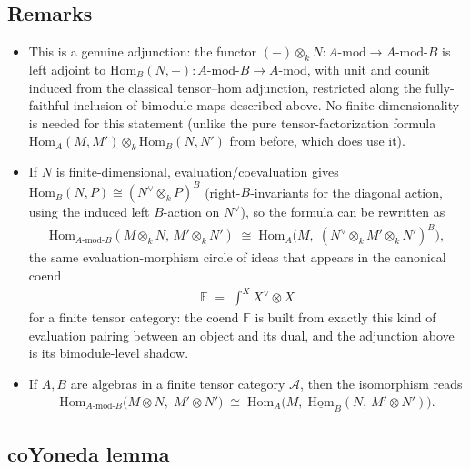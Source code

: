 \documentclass[11pt]{article}
\theoremstyle{definition}
\begin{document}
\subsection*{Remarks}

\begin{itemize}
\item This is a genuine adjunction: the functor $(-)\otimes_k N : A\text{-}\mathrm{mod}
\to A\text{-}\mathrm{mod}\text{-}B$ is left adjoint to
$\mathrm{Hom}_B(N,-) : A\text{-}\mathrm{mod}\text{-}B \to A\text{-}\mathrm{mod}$, with unit
and counit induced from the classical tensor--hom adjunction, restricted along the
fully-faithful inclusion of bimodule maps described above. No finite-dimensionality is
needed for this statement (unlike the pure tensor-factorization formula
$\mathrm{Hom}_A(M,M')\otimes_k\mathrm{Hom}_B(N,N')$ from before, which does use it).

\item If $N$ is finite-dimensional, evaluation/coevaluation gives
$\mathrm{Hom}_B(N,P) \cong (N^\vee \otimes_k P)^B$ (right-$B$-invariants for the
diagonal action, using the induced left $B$-action on $N^\vee$), so the formula can be
rewritten as
\begin{align}
\mathrm{Hom}_{A\text{-}\mathrm{mod}\text{-}B}(M\otimes_kN,\,M'\otimes_kN')
\;\cong\;
\mathrm{Hom}_A\big(M,\; (N^\vee\otimes_k M'\otimes_k N')^B\big),
\end{align}
the same evaluation-morphism circle of ideas that appears in the canonical coend
\begin{align}
\mathbb{F} \;=\; \int^{X} X^\vee \otimes X
\end{align}
for a finite tensor category: the coend $\mathbb{F}$ is built from exactly this kind of
evaluation pairing between an object and its dual, and the adjunction above is its
bimodule-level shadow.
\item If $A,B$ are algebras in a finite tensor category $\mathcal{A}$, then the isomorphism reads 
\begin{align}
\boxed{
\mathrm{Hom}_{A\text{-}\mathrm{mod}\text{-}B}\big(M\otimes N,\; M'\otimes N'\big)
\;\cong\;
\mathrm{Hom}_A\big(M,\; \underline{\mathrm{Hom}}_B(N,\, M'\otimes N')\big).}
\end{align}
\end{itemize}



\subsection{coYoneda lemma}
\end{document}
